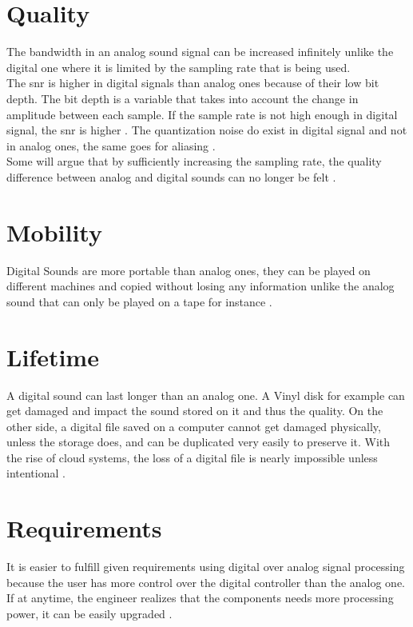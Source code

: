 
\section{Quality}

The bandwidth in an analog sound signal can be increased infinitely unlike the digital one where it is limited by the sampling rate that is being used. \\
The \gls{snr} is higher in digital signals than analog ones because of their low bit depth. The bit depth is a variable that takes into account the change in amplitude between each sample. If the sample rate is not high enough in digital signal, the \gls{snr} is higher \citep{analog_quality}. The quantization noise do exist in digital signal and not in analog ones, the same goes for aliasing \citep{analog_aliasing}. \\
Some will argue that by sufficiently increasing the sampling rate, the quality difference between analog and digital sounds can no longer be felt \citep{analog_storage}.

\section{Mobility}

Digital Sounds are more portable than analog ones, they can be played on different machines and copied without losing any information unlike the analog sound that can only be played on a tape for instance \citep{analog_quality}. 

\section{Lifetime}

A digital sound can last longer than an analog one. A Vinyl disk for example can get damaged and impact the sound stored on it and thus the quality. On the other side, a digital file saved on a computer cannot get damaged physically, unless the storage does, and can be duplicated very easily to preserve it. With the rise of cloud systems, the loss of a digital file is nearly impossible unless intentional \citep{analog_storage}.


\section{Requirements}

It is easier to fulfill given requirements using digital over analog signal processing because the user has more control over the digital controller than the analog one. If at anytime, the engineer realizes that the components needs more processing power, it can be easily upgraded \citep{analog_requirements}.

